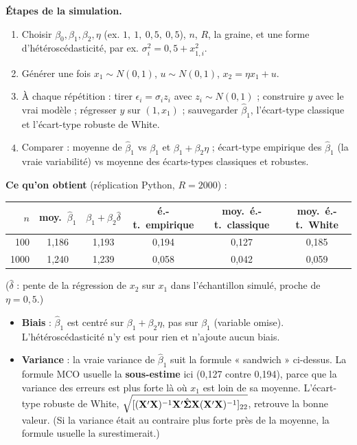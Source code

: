 \documentclass[11pt,a4paper]{article}
\begin{document}
\textbf{Étapes de la simulation.}
\begin{enumerate}[nosep]
\item Choisir $\beta_0,\beta_1,\beta_2,\eta$ (ex. $1,\ 1,\ 0{,}5,\ 0{,}5$), $n$, $R$, la graine, et une forme d'hétéroscédasticité, par ex. $\sigma_i^2=0{,}5+x_{1,i}^2$.
\item Générer une fois $x_1\sim N(0,1)$, $u\sim N(0,1)$, $x_2=\eta x_1+u$.
\item À chaque répétition : tirer $\epsilon_i=\sigma_i z_i$ avec $z_i\sim N(0,1)$ ; construire $y$ avec le vrai modèle ; régresser $y$ sur $(1,x_1)$ ; sauvegarder $\hat\beta_1$, l'écart-type classique et l'écart-type robuste de White.
\item Comparer : moyenne de $\hat\beta_1$ vs $\beta_1$ et $\beta_1+\beta_2\eta$ ; écart-type empirique des $\hat\beta_1$ (la vraie variabilité) vs moyenne des écarts-types classiques et robustes.
\end{enumerate}

\textbf{Ce qu'on obtient} (réplication Python, $R=2000$) :
\begin{center}
\begin{tabular}{@{}rccccc@{}}
\toprule
$n$ & moy.\ $\hat\beta_1$ & $\beta_1+\beta_2\hat\delta$ & é.-t.\ empirique & moy.\ é.-t.\ classique & moy.\ é.-t.\ White \\
\midrule
100 & 1,186 & 1,193 & 0,194 & 0,127 & 0,185 \\
1000 & 1,240 & 1,239 & 0,058 & 0,042 & 0,059 \\
\bottomrule
\end{tabular}
\end{center}
($\hat\delta$ : pente de la régression de $x_2$ sur $x_1$ dans l'échantillon simulé, proche de $\eta=0{,}5$.)

\begin{reponse}
\begin{itemize}[nosep]
\item \textbf{Biais} : $\hat\beta_1$ est centré sur $\beta_1+\beta_2\eta$, pas sur $\beta_1$ (variable omise). L'hétéroscédasticité n'y est pour rien et n'ajoute aucun biais.
\item \textbf{Variance} : la vraie variance de $\hat\beta_1$ suit la formule « sandwich » ci-dessus. La formule MCO usuelle la \textbf{sous-estime} ici (0,127 contre 0,194), parce que la variance des erreurs est plus forte là où $x_1$ est loin de sa moyenne. L'écart-type robuste de White, $\sqrt{[(\mathbf{X}'\mathbf{X})^{-1}\mathbf{X}'\hat{\bm\Sigma}\mathbf{X}(\mathbf{X}'\mathbf{X})^{-1}]_{22}}$, retrouve la bonne valeur. (Si la variance était au contraire plus forte près de la moyenne, la formule usuelle la surestimerait.)
\end{itemize}
\end{reponse}
\end{document}
